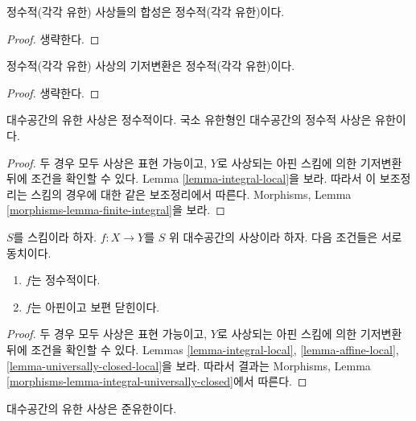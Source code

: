 \begin{lemma}
\label{lemma-composition-integral}
정수적(각각 유한) 사상들의 합성은 정수적(각각 유한)이다.
\end{lemma}

\begin{proof}
생략한다.
\end{proof}

\begin{lemma}
\label{lemma-base-change-integral}
정수적(각각 유한) 사상의 기저변환은 정수적(각각 유한)이다.
\end{lemma}

\begin{proof}
생략한다.
\end{proof}

\begin{lemma}
\label{lemma-finite-integral}
대수공간의 유한 사상은 정수적이다.
국소 유한형인 대수공간의 정수적 사상은 유한이다.
\end{lemma}

\begin{proof}
두 경우 모두 사상은 표현 가능이고, $Y$로 사상되는 아핀 스킴에 의한
기저변환 뒤에 조건을 확인할 수 있다.
Lemma \ref{lemma-integral-local}을 보라. 따라서 이 보조정리는 스킴의
경우에 대한 같은 보조정리에서 따른다. Morphisms, Lemma
\ref{morphisms-lemma-finite-integral}을 보라.
\end{proof}

\begin{lemma}
\label{lemma-integral-universally-closed}
$S$를 스킴이라 하자.
$f : X \to Y$를 $S$ 위 대수공간의 사상이라 하자.
다음 조건들은 서로 동치이다.
\begin{enumerate}
\item $f$는 정수적이다.
\item $f$는 아핀이고 보편 닫힌이다.
\end{enumerate}
\end{lemma}

\begin{proof}
두 경우 모두 사상은 표현 가능이고, $Y$로 사상되는 아핀 스킴에 의한
기저변환 뒤에 조건을 확인할 수 있다. Lemmas
\ref{lemma-integral-local}, \ref{lemma-affine-local},
\ref{lemma-universally-closed-local}을 보라. 따라서 결과는 Morphisms,
Lemma \ref{morphisms-lemma-integral-universally-closed}에서 따른다.
\end{proof}

\begin{lemma}
\label{lemma-finite-quasi-finite}
대수공간의 유한 사상은 준유한이다.
\end{lemma}

